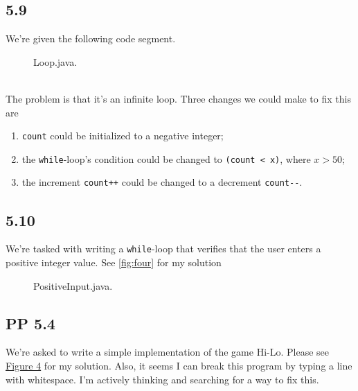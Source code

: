\documentclass[leqno, 11pt]{article}
\newcommand{\iftcodefigure}[3]{%
  \begin{codefigure}
    \label{#1}
    \addtocounter{figure}{-1}
    
  \end{codefigure}
}
\begin{document}
\subsection*{5.9}
We're given the following code segment.
\begin{figure}[h!]
  \centering
  
  \caption{Loop.java.}
  \label{fig:three}
\end{figure}\\
The problem is that it's an infinite loop. Three changes we could make to fix this are
\begin{enumerate}
  \item \texttt{count} could be initialized to a negative integer;
  \item the \texttt{while}-loop's condition could be changed to \texttt{(count < x)}, where $x>50$;
  \item the increment \texttt{count++} could be changed to a decrement \verb|count--|.
\end{enumerate}
\subsection*{5.10}
We're tasked with writing a \texttt{while}-loop that verifies that the user enters a positive integer value. See \autoref{fig:four} for my solution
\begin{figure}[h!]
  \centering
  
  \caption{PositiveInput.java.}
  \label{fig:four}
\end{figure}
\subsection*{PP 5.4}
We're asked to write a simple implementation of the game Hi-Lo. Please see \hyperref[fig:five]{Figure 4} for my solution. Also, it seems I can break this program by typing a line with whitespace. I'm actively thinking and searching for a way to fix this.
\iftcodefigure{fig:five}{HiLo.java}{/home/brandon/eclipse-workspace/ift_194_hw/src/hw_2/HiLo.java}
\end{document}
